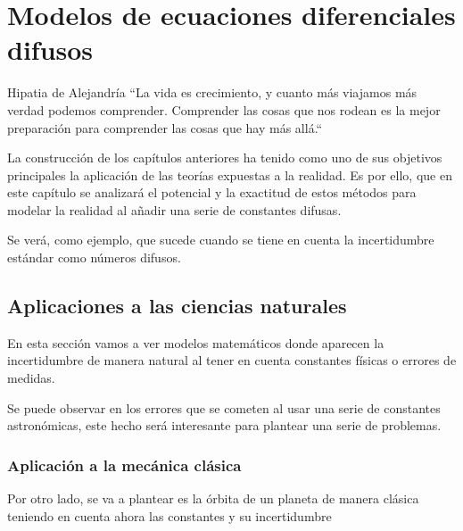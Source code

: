
\chapter{Modelos de ecuaciones diferenciales difusos}
\begin{chapquote}{Hipatia de Alejandría}
	``La vida es crecimiento, y cuanto más viajamos más verdad podemos comprender. Comprender las cosas que nos rodean es la mejor preparación para comprender las cosas que hay más allá.``
\end{chapquote}
La construcción de los capítulos anteriores ha tenido como uno de sus objetivos principales la aplicación de las teorías expuestas a la realidad. Es por ello, que en este capítulo se analizará el potencial y la exactitud de estos métodos para modelar la realidad al añadir una serie de constantes difusas.

Se verá, como ejemplo, que sucede cuando se tiene en cuenta la incertidumbre estándar como números difusos.

\section{Aplicaciones a las ciencias naturales}

En esta sección vamos a ver modelos matemáticos donde aparecen la incertidumbre de manera natural al tener en cuenta constantes físicas o errores de medidas. 

Se puede observar en \cite{nasa} los errores que se cometen al usar una serie de constantes astronómicas, este hecho será interesante para plantear una serie de problemas.
\subsection{Aplicación a la mecánica clásica}
Por otro lado, se va a plantear es la órbita de un planeta de manera clásica teniendo en cuenta ahora las constantes y su incertidumbre

